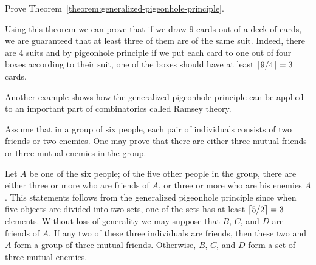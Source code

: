 \begin{exercise}
    Prove Theorem~\ref{theorem:generalized-pigeonhole-principle}.
\end{exercise}

Using this theorem we can prove that if we draw $9$ cards out of a deck of
cards, we are guaranteed that at least three of them are of the same suit.
Indeed, there are $4$ suits and by pigeonhole principle if we put each card to
one out of four boxes according to their suit, one of the boxes should have
at least $\left\lceil {9 / 4} \right\rceil = 3$ cards.

Another example shows how the generalized pigeonhole principle can be applied
to an important part of combinatorics called Ramsey theory.

Assume that in a group of six people, each pair of individuals consists of two
friends or two enemies. One may prove that there are either three mutual
friends or three mutual enemies in the group.

Let $A$ be one of the six people; of the five other people in the group, there
are either three or more who are friends of $A$, or three or more who are
his enemies $A$. This statements follows from the generalized pigeonhole
principle since when five objects are divided into two sets, one of the sets
has at least $\left\lceil {5 / 2} \right\rceil = 3$ elements. Without loss of generality we may
suppose that $B$, $C$, and $D$ are friends of $A$. If any two of these three
individuals are friends, then these two and $A$ form a group of three mutual
friends. Otherwise, $B$, $C$, and $D$ form a set of three mutual enemies.


